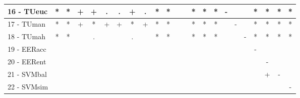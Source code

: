 \begin{table}[h]
\begin{center}
\begin{tabular}{lcc|cc|cc|cc|cc|cc|cc|cc|cc|cc|cc}
16 - TUeuc	& * & * & + & + & . & . & + & . & * & * &   &   & * & * & * & - &   &   & * & * & * & * \\ \hline
17 - TUman	& * & * & + & * & + & + & * & + & * & * &   &   & * & * & * &   & - &   & * & * & * & * \\
18 - TUmah	& * & * &   & . &   &   & . &   & * & * &   &   & * & * & * &   &   & - & * & * & * & * \\ \hline
19 - EERacc	&   &   &   &   &   &   &   &   &   &   &   &   &   &   &   &   &   &   & - &   &   &   \\
20 - EERent	&   &   &   &   &   &   &   &   &   &   &   &   &   &   &   &   &   &   &   & - &   &   \\ \hline
21 - SVMbal	&   &   &   &   &   &   &   &   &   &   &   &   &   &   &   &   &   &   &   & + & - &   \\
22 - SVMsim	&   &   &   &   &   &   &   &   &   &   &   &   &   &   &   &   &   &   &   &   &   & - \\ \hline\end{tabular}

\label{stratsfriedCIELM}
\end{center}
\end{table}